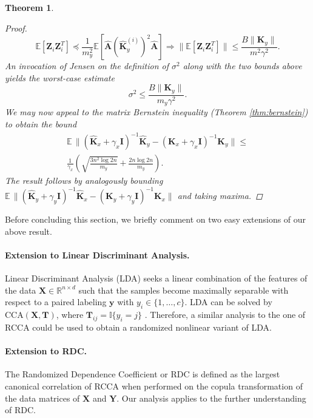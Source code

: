\documentclass{article}
\newcommand{\E}{\mathbb{E}}
\newtheorem{theorem}{Theorem}
\begin{document}
\begin{theorem}
\begin{proof}
    \begin{equation*}
      \E[\bm Z_i \bm Z_i^T]  \preceq \frac{1}{m_y^2}\E[\hat{\bm A}(\hat{\bm
      K}_y^{(i)})^2\hat{\bm A}] \Rightarrow
      \|\E[\bm Z_i \bm Z_i^T]\| \le \frac{B\|\bm K_y\|}{m^2\gamma^2}.
    \end{equation*}
    An invocation of Jensen on the definition of $\sigma^2$ along with the two
    bounds above yields the worst-case estimate
    \begin{equation*}
      \sigma^2 \le  \frac{B\|\bm K_y\|}{m_y\gamma^2}.
    \end{equation*}
    We may now appeal to the matrix Bernstein inequality
    (Theorem \ref{thm:bernstein}) to obtain the bound
    \begin{align*}
    \mathbb{E}\,\|(\hat{\bm K}_x+\gamma_x \bm I)^{-1}\hat{\bm K}_y-({\bm
    K}_x+\gamma_x \bm I)^{-1}{\bm K}_y\| \leq\\
    \frac{1}{\gamma_x}\left(\sqrt{\frac{3n^2\log 2n}{m_y}}+\frac{2n\log 2n}{m_y}
    \right ).
    \end{align*}
    The result follows by analogously bounding
    $\mathbb{E}\,\|(\hat{\bm K}_y+\gamma_y \bm I)^{-1}\hat{\bm K}_x-({\bm
    K}_y+\gamma_y \bm I)^{-1}{\bm K}_x\|$ and taking maxima.
    \end{proof}
  \end{theorem}

  Before concluding this section, we briefly comment on two easy extensions of
  our above result. 

  \paragraph{Extension to Linear Discriminant Analysis.}
  Linear Discriminant Analysis (LDA) seeks a linear combination of the features
  of the data $\bm X \in \mathbb{R}^{n\times d}$ such that the samples become
  maximally separable with respect to a paired labeling $\bm y$ with $y_i \in
  \{1,\ldots,c\}$. LDA can be solved by $\mathrm{CCA}(\bm X,\bm T)$, where $\bm
  T_{ij} = \mathbb{I}\{y_i = j\}$ \citep{Bie05}.  Therefore, a similar analysis
  to the one of RCCA could be used to obtain a randomized nonlinear variant of
  LDA.
  
  \paragraph{Extension to RDC.}
  The Randomized Dependence Coefficient or RDC \citep{Lopez-Paz13} is defined as
  the largest canonical correlation of RCCA when performed on the copula
  transformation of the data matrices of $\bm X$ and $\bm Y$. Our analysis
  applies to the further understanding of RDC.
\end{document}
